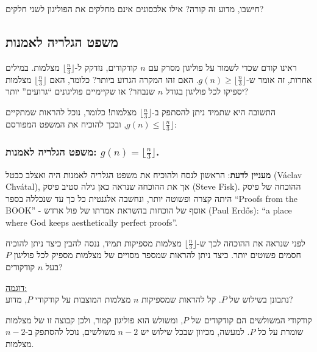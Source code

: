 \documentclass[
]{book}
\begin{document}
חישבו, מדוע זה קורה? אילו אלכסונים אינם מחלקים את הפוליגון לשני חלקים?

\hypertarget{agp-thm}{%
\subsection{משפט הגלריה לאמנות}\label{agp-thm}}

ראינו קודם שכדי לשמור על פוליגון מסרק עם \(n\) קודקודים, נזדקק ל-\(\lfloor \frac{n}{3} \rfloor\) מצלמות. במילים אחרות, זה אומר ש-\(g(n)\ge \lfloor \frac{n}{3} \rfloor\). האם זהו המקרה הגרוע ביותר? כלומר, האם \(\lfloor \frac{n}{3} \rfloor\) מצלמות יספיקו לכל פוליגון בגודל \(n\) שנבחר? או שקיימיים פוליגונים ``גרועים'' יותר?

התשובה היא שתמיד ניתן להסתפק ב-\(\lfloor \frac{n}{3} \rfloor\) מצלמות! כלומר, נוכל להראות שמתקיים \(g(n)\le \lfloor \frac{n}{3} \rfloor\), ובכך להוכיח את המשפט המפורסם:

\hypertarget{ux5deux5e9ux5e4ux5d8-ux5d4ux5d2ux5dcux5e8ux5d9ux5d4-ux5dcux5d0ux5deux5e0ux5d5ux5ea-gnlfloor-fracn3-rfloor.}{%
\subsubsection*{\texorpdfstring{משפט הגלריה לאמנות: \(g(n)=\lfloor \frac{n}{3} \rfloor\).}{משפט הגלריה לאמנות: g(n)=\textbackslash lfloor \textbackslash frac\{n\}\{3\} \textbackslash rfloor.}}\label{ux5deux5e9ux5e4ux5d8-ux5d4ux5d2ux5dcux5e8ux5d9ux5d4-ux5dcux5d0ux5deux5e0ux5d5ux5ea-gnlfloor-fracn3-rfloor.}}

\textbf{מעניין לדעת}: הראשון לנסח ולהוכיח את משפט הגלריה לאמנות היה ואצלב כבטל (Václav Chvátal), אך את ההוכחה שנראה כאן גילה סטיב פיסק (Steve Fisk). ההוכחה של פיסק היתה קצרה ופשוטה יותר, ונחשבה אלגנטית כל כך עד שנכללה בספר ``Proofs from the BOOK'' - אוסף של הוכחות בהשראת אמרתו של פול ארדש (Paul Erdős): ``a place where God keeps aesthetically perfect proofs''.

לפני שנראה את ההוכחה לכך ש-\(\lfloor \frac{n}{3} \rfloor\) מצלמות מספיקות תמיד, ננסה להבין כיצד ניתן להוכיח חסמים פשוטים יותר. כיצד ניתן להראות שמספר מסויים של מצלמות מספיק לכל פוליגון \(P\) בעל \(n\) קודקודים?

\ul{דוגמה:\\
}נתבונן בשילוש של \(P\). קל להראות שמספיקות \(n\) מצלמות המוצבות על קודקודי \(P\), מדוע?

קודקודי המשולשים הם קודקודים של \(P\), ומשולש הוא פוליגון קמור, ולכן קבוצה זו של מצלמות שומרת על כל \(P\). למעשה, מכיוון שבכל שילוש יש \(n-2\) משולשים, נוכל להסתפק ב-\(n-2\) מצלמות.
\end{document}
